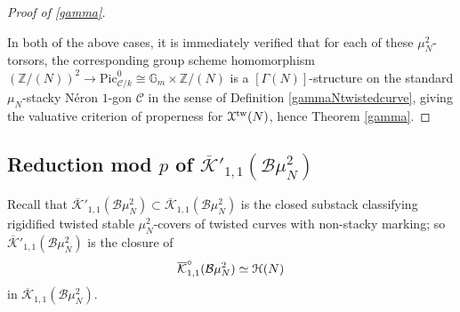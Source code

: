 \documentclass[11pt]{amsart}
\theoremstyle{definition}
\begin{document}
\begin{proof}[Proof of \ref{gamma}]
\begin{center}
\end{center}
In both of the above cases, it is immediately verified that for each of these $\mu_N^2$-torsors, the corresponding group scheme homomorphism $(\mathbb{Z}/(N))^2 \rightarrow \mathrm{Pic}^0_{{\mathcal{C}}/k} \cong \mathbb{G}_m \times \mathbb{Z}/(N)$ is a $[\Gamma(N)]$-structure on the standard $\mu_N$-stacky N\'eron $1$-gon ${\mathcal{C}}$ in the sense of Definition \ref{gammaNtwistedcurve}, giving the valuative criterion of properness for ${\mathbf{\EuScript{X}}}^{\mathrm{tw}}(N)$, hence Theorem \ref{gamma}.
\end{proof}

\subsection*{Reduction mod $p$ of $\overline{\mathcal{K}}'_{1,1}({\mathcal{B}} \mu_N^2)$}

Recall that $\overline{\mathcal{K}}'_{1,1}({\mathcal{B}} \mu_N^2) \subset \overline{\mathcal{K}}_{1,1}({\mathcal{B}} \mu_N^2)$ is the closed substack classifying rigidified twisted stable $\mu_N^2$-covers of twisted curves with non-stacky marking; so $\overline{\mathcal{K}}'_{1,1}({\mathcal{B}} \mu_N^2)$ is the closure of 
\begin{displaymath}
\overline{\mathcal{K}}^\circ_{1,1} ({\mathcal{B}} \mu_N^2) \simeq {\mathbf{\EuScript{H}}}(N) 
\end{displaymath}
in $\overline{\mathcal{K}}_{1,1}({\mathcal{B}} \mu_N^2)$.
\end{document}
